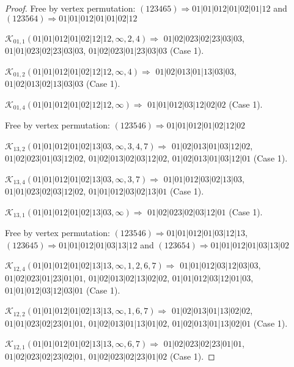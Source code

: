 \documentclass[12pt]{article}
\theoremstyle{plain}
\theoremstyle{definition}
\theoremstyle{remark}
\newcommand{\fancy}[1]{\mathcal{#1}}
\def\K{\fancy{K}}
\begin{document}
\begin{proof}
	
	
	Free by vertex permutation: $(1 2 3 4 6 5)\Rightarrow 01|01|012|01|02|01|12$ and $(1 2 3 5 6 4)\Rightarrow 01|01|012|01|01|02|12$
	
	
	
	\bigskip
	
	$\K_{01,1}(01|01|012|01|02|12|12,\infty,2, 4)\Rightarrow $ $01|02|023|02|23|03|03$, $01|01|023|02|23|03|03$, $01|02|023|01|23|03|03$ (Case 1).
	
	$\K_{01,2}(01|01|012|01|02|12|12,\infty,4)\Rightarrow $ $01|02|013|01|13|03|03$, $01|02|013|02|13|03|03$ (Case 1).
	
	$\K_{01,4}(01|01|012|01|02|12|12,\infty)\Rightarrow $ $01|01|012|03|12|02|02$ (Case 1).
	
	
	
	Free by vertex permutation: $(1 2 3 5 4 6)\Rightarrow 01|01|012|01|02|12|02$
	
	
	
	\bigskip
	
	$\K_{13,2}(01|01|012|01|02|13|03,\infty,3, 4, 7)\Rightarrow $ $01|02|013|01|03|12|02$, $01|02|023|01|03|12|02$, $01|02|013|02|03|12|02$, $01|02|013|01|03|12|01$ (Case 1).
	
	$\K_{13,4}(01|01|012|01|02|13|03,\infty,3, 7)\Rightarrow $ $01|01|012|03|02|13|03$, $01|01|023|02|03|12|02$, $01|01|012|03|02|13|01$ (Case 1).
	
	$\K_{13,1}(01|01|012|01|02|13|03,\infty)\Rightarrow $ $01|02|023|02|03|12|01$ (Case 1).
	
	
	
	Free by vertex permutation: $(1 2 3 5 4 6)\Rightarrow 01|01|012|01|03|12|13$, $(1 2 3 6 4 5)\Rightarrow 01|01|012|01|03|13|12$ and $(1 2 3 6 5 4)\Rightarrow 01|01|012|01|03|13|02$
	
	
	
	\bigskip
	
	$\K_{12,4}(01|01|012|01|02|13|13,\infty,1, 2, 6, 7)\Rightarrow $ $01|01|012|03|12|03|03$, $01|02|023|01|23|01|01$, $01|02|013|02|13|02|02$, $01|01|012|03|12|01|03$, $01|01|012|03|12|03|01$ (Case 1).
	
	$\K_{12,2}(01|01|012|01|02|13|13,\infty,1, 6, 7)\Rightarrow $ $01|02|013|01|13|02|02$, $01|01|023|02|23|01|01$, $01|02|013|01|13|01|02$, $01|02|013|01|13|02|01$ (Case 1).
	
	$\K_{12,1}(01|01|012|01|02|13|13,\infty,6, 7)\Rightarrow $ $01|02|023|02|23|01|01$, $01|02|023|02|23|02|01$, $01|02|023|02|23|01|02$ (Case 1).
	
	
	

\end{proof}
\end{document}
